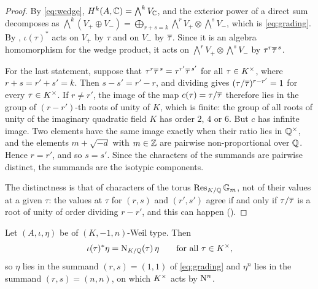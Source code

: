 \begin{proof}
By \eqref{eq:wedge}, $H^{k}(A,\mathbb{C})=\bigwedge^{k}V_{\mathbb{C}}$, and the exterior
power of a direct sum decomposes as
$\bigwedge^{k}(V_{+}\oplus V_{-})=\bigoplus_{r+s=k}\bigwedge^{r}V_{+}\otimes\bigwedge^{s}V_{-}$,
which is \eqref{eq:grading}. By , $\iota(\tau)^{*}$ acts on
$V_{+}$ by $\tau$ and on $V_{-}$ by $\overline{\tau}$. Since it is an algebra
homomorphism for the wedge product, it acts on
$\bigwedge^{r}V_{+}\otimes\bigwedge^{s}V_{-}$ by $\tau^{r}\overline{\tau}^{\,s}$.

For the last statement, suppose that
$\tau^{r}\overline{\tau}^{\,s}=\tau^{r'}\overline{\tau}^{\,s'}$ for all $\tau\in K^{\times}$,
where $r+s=r'+s'=k$. Then $s-s'=r'-r$, and dividing gives
$(\tau/\overline{\tau})^{r-r'}=1$ for every $\tau\in K^{\times}$. If $r\ne r'$, the image
of the map $c(\tau)=\tau/\overline{\tau}$ therefore lies in the group of
$(r-r')$-th roots of unity of $K$, which is finite: the group of all roots of
unity of the imaginary quadratic field $K$ has order $2$, $4$ or $6$. But $c$
has infinite image. Two elements have the same image exactly when their ratio
lies in $\mathbb{Q}^{\times}$, and the elements $m+\sqrt{-d}$ with $m\in\mathbb{Z}$ are
pairwise non-proportional over $\mathbb{Q}$. Hence $r=r'$, and so $s=s'$. Since the
characters of the summands are pairwise distinct, the summands are the
isotypic components.

The distinctness is that of characters of the torus
$\operatorname{Res}_{K/\mathbb{Q}}\mathbb{G}_{m}$, not of their values at a given $\tau$: the
values at $\tau$ for $(r,s)$ and $(r',s')$ agree if and only if
$\tau/\overline{\tau}$ is a root of unity of order dividing $r-r'$, and this can
happen ().
\end{proof}

\begin{lemma}\label{lem:NSchar}
Let $(A,\iota,\eta)$ be of $(K,-1,n)$-Weil type. Then
\[
  \iota(\tau)^{*}\eta=\mathrm{N}_{K/\mathbb{Q}}(\tau)\,\eta\qquad\text{for all }\tau\in K^{\times},
\]
so $\eta$ lies in the summand $(r,s)=(1,1)$ of \eqref{eq:grading} and
$\eta^{n}$ lies in the summand $(r,s)=(n,n)$, on which $K^{\times}$ acts by $\mathrm{N}^{n}$.
\end{lemma}

